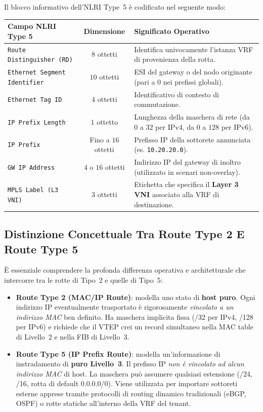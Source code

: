\documentclass[11pt, a4paper]{article}
\begin{document}
Il blocco informativo dell'NLRI Type~5 è codificato nel seguente modo:
\begin{center}
\begin{tabular}{|l|c|p{8.5cm}|}
\hline
\textbf{Campo NLRI Type 5} & \textbf{Dimensione} & \textbf{Significato Operativo} \\ \hline
\texttt{Route Distinguisher (RD)} & $8$ ottetti & Identifica univocamente l'istanza VRF di provenienza della rotta. \\ \hline
\texttt{Ethernet Segment Identifier} & $10$ ottetti & ESI del gateway o del nodo originante (pari a $0$ nei prefissi globali). \\ \hline
\texttt{Ethernet Tag ID} & $4$ ottetti & Identificativo di contesto di commutazione. \\ \hline
\texttt{IP Prefix Length} & $1$ ottetto & Lunghezza della maschera di rete (da $0$ a $32$ per IPv4, da $0$ a $128$ per IPv6). \\ \hline
\texttt{IP Prefix} & Fino a $16$ ottetti & Prefisso IP della sottorete annunciata (es. \texttt{10.20.20.0}). \\ \hline
\texttt{GW IP Address} & $4$ o $16$ ottetti & Indirizzo IP del gateway di inoltro (utilizzato in scenari non-overlay). \\ \hline
\texttt{MPLS Label (L3 VNI)} & $3$ ottetti & Etichetta che specifica il \textbf{Layer 3 VNI} associato alla VRF di destinazione. \\ \hline
\end{tabular}
\end{center}

\subsection{Distinzione Concettuale Tra Route Type 2 E Route Type 5}

È essenziale comprendere la profonda differenza operativa e architetturale che intercorre tra le rotte di Tipo~2 e quelle di Tipo~5:
\begin{itemize}
    \item \textbf{Route Type 2 (MAC/IP Route)}: modella uno stato di \textbf{host puro}. Ogni indirizzo IP eventualmente trasportato è rigorosamente \emph{vincolato a un indirizzo MAC} ben definito. Ha maschera implicita fissa (/32 per IPv4, /128 per IPv6) e richiede che il VTEP crei un record simultaneo nella MAC table di Livello~2 e nella FIB di Livello~3.
    \item \textbf{Route Type 5 (IP Prefix Route)}: modella un'informazione di instradamento di \textbf{puro Livello~3}. Il prefisso IP \emph{non è vincolato ad alcun indirizzo MAC} di host. La maschera può assumere qualsiasi estensione (/24, /16, rotta di default 0.0.0.0/0). Viene utilizzata per importare sottoreti esterne apprese tramite protocolli di routing dinamico tradizionali (eBGP, OSPF) o rotte statiche all'interno della VRF del tenant.
\end{itemize}
\end{document}
